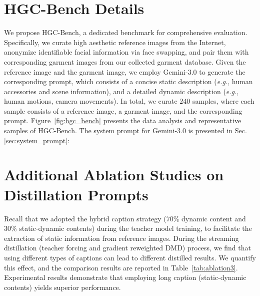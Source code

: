 \section{HGC-Bench Details}
%
We propose HGC-Bench, a dedicated benchmark for comprehensive evaluation. Specifically, we curate high aesthetic reference images from the Internet, anonymize identifiable facial information via face swapping, and pair them with corresponding garment images from our collected garment database.
Given the reference image and the garment image, we employ Gemini-3.0 to generate the corresponding prompt, which consists of a concise static description (\emph{e.g.}, human accessories and scene information), and a detailed dynamic description (\emph{e.g.}, human motions, camera movements).
In total, we curate $240$ samples, where each sample consists of a reference image, a garment image, and the corresponding prompt.
%
Figure~\ref{fig:hgc_bench} presents the data analysis and representative samples of HGC-Bench.
% 
The system prompt for Gemini-3.0 is presented in Sec.\,\ref{sec:system_prompt}:





\section{Additional Ablation Studies on Distillation Prompts}
\label{sec:ablation4}
% 
Recall that we adopted the hybrid caption strategy (70\% dynamic content and 30\% static-dynamic contents) during the teacher model training, to facilitate the extraction of static information from reference images.
% 
During the streaming distillation (teacher forcing and gradient reweighted DMD) process, we find that using different types of captions can lead to different distilled results.
We quantify this effect, and the comparison results are reported in Table~\ref{tab:ablation3}.
% 
Experimental results demonstrate that employing long caption (static-dynamic contents) yields superior performance.




